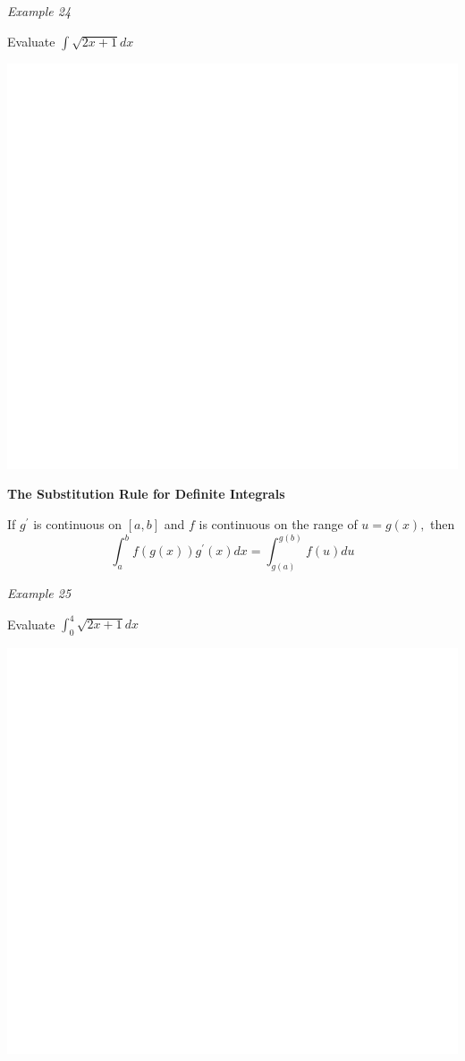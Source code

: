 \documentclass[]{book}
\begin{document}
\emph{Example 24}

Evaluate \(\int\sqrt{2x+1} dx\)

\begin{center}\includegraphics[width=1\linewidth]{figure/LB43-1} \end{center}

\newpage

\textbf{The Substitution Rule for Definite Integrals}

If \(g^\prime\) is continuous on \([a,b]\) and \(f\) is continuous on the range of \(u=g(x),\) then
\[\int_a^bf(g(x))g^\prime(x)dx=\int_{g(a)}^{g(b)} f(u)du\]

\emph{Example 25}

Evaluate \(\int_0^4\sqrt{2x+1} dx\)

\begin{center}\includegraphics[width=1\linewidth]{figure/LB44-1} \end{center}
\end{document}
